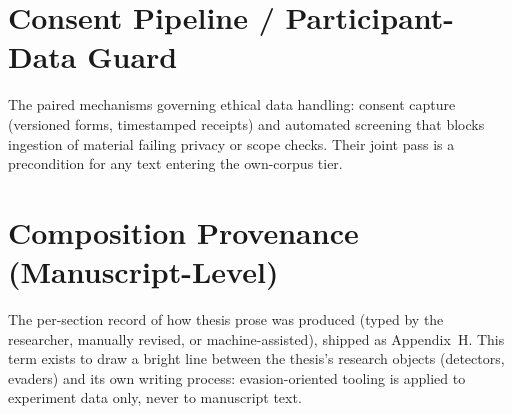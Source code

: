 \section{Consent Pipeline / Participant-Data Guard}
The paired mechanisms governing ethical data handling: consent capture
(versioned forms, timestamped receipts) and automated screening that
blocks ingestion of material failing privacy or scope checks. Their joint
pass is a precondition for any text entering the own-corpus tier.

\section{Composition Provenance (Manuscript-Level)}
The per-section record of how thesis prose was produced (typed by the
researcher, manually revised, or machine-assisted), shipped as
Appendix~H. This term exists to draw a bright line between the thesis's
research objects (detectors, evaders) and its own writing process:
evasion-oriented tooling is applied to experiment data only, never to
manuscript text.